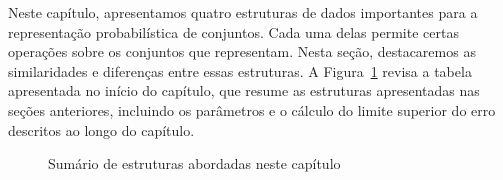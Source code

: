 Neste capítulo, apresentamos quatro estruturas de dados importantes para a representação probabilística de conjuntos. Cada uma delas permite certas operações sobre os conjuntos que representam. Nesta seção, destacaremos as similaridades e diferenças entre essas estruturas. A Figura~\ref{fig:probds_table2} revisa a tabela apresentada no início do capítulo, que resume as estruturas apresentadas nas seções anteriores, incluindo os parâmetros e o cálculo do limite superior do erro descritos ao longo do capítulo.

\begin{figure}[!htbp]
\centering
{}
\caption{Sumário de estruturas abordadas neste capítulo}
\label{fig:probds_table2}
\end{figure}

